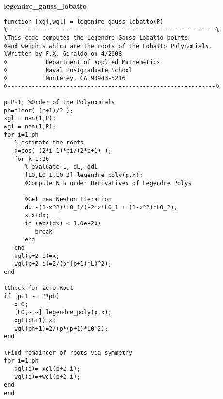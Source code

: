 \vspace{0.5cm}

\noindent\textbf{legendre\_gauss\_lobatto}

\begin{lstlisting}[style=myMatlab,name=lec34n-ex2]
function [xgl,wgl] = legendre_gauss_lobatto(P)
%------------------------------------------------------------%
%This code computes the Legendre-Gauss-Lobatto points 
%and weights which are the roots of the Lobatto Polynomials.
%Written by F.X. Giraldo on 4/2008
%           Department of Applied Mathematics
%           Naval Postgraduate School 
%           Monterey, CA 93943-5216
%------------------------------------------------------------%

p=P-1; %Order of the Polynomials
ph=floor( (p+1)/2 );
xgl = nan(1,P);
wgl = nan(1,P);
for i=1:ph
   % estimate the roots
   x=cos( (2*i-1)*pi/(2*p+1) );
   for k=1:20
      % evaluate L, dL, ddL
      [L0,L0_1,L0_2]=legendre_poly(p,x); 
      %Compute Nth order Derivatives of Legendre Polys
      
      %Get new Newton Iteration
      dx=-(1-x^2)*L0_1/(-2*x*L0_1 + (1-x^2)*L0_2);
      x=x+dx;
      if (abs(dx) < 1.0e-20) 
         break
      end
   end
   xgl(p+2-i)=x;
   wgl(p+2-i)=2/(p*(p+1)*L0^2);
end

%Check for Zero Root
if (p+1 ~= 2*ph)
   x=0;
   [L0,~,~]=legendre_poly(p,x);
   xgl(ph+1)=x;
   wgl(ph+1)=2/(p*(p+1)*L0^2);
end
   
%Find remainder of roots via symmetry
for i=1:ph
   xgl(i)=-xgl(p+2-i);
   wgl(i)=+wgl(p+2-i);
end   
end
\end{lstlisting}
